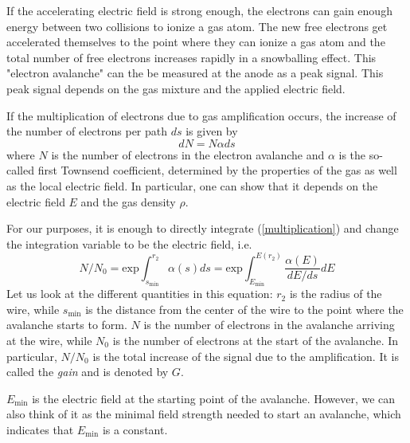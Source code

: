 \documentclass[12pt]{article}
\begin{document}
If the accelerating electric field is strong enough, the electrons can gain enough energy between two collisions to ionize a gas atom. The new free electrons get accelerated themselves to the point where they can ionize a gas atom and the total number of free electrons increases rapidly in a snowballing effect. This "electron avalanche" can the be measured at the anode as a peak signal. This peak signal depends on the gas mixture and the applied electric field.

If the multiplication of electrons due to gas amplification occurs, the increase of the number of electrons per path $ds$ is given by
\begin{equation}
	dN = N\alpha ds
\label{multiplication}
\end{equation}
where $N$ is the number of electrons in the electron avalanche and $\alpha$ is the so-called first Townsend coefficient, determined by the properties of the gas as well as the local electric field. In particular, one can show that it depends on the electric field $E$ and the gas density $\rho$.
	
For our purposes, it is enough to directly integrate (\ref{multiplication}) and change the integration variable to be the electric field, i.e.
\begin{equation}
	N/N_0 = \text{exp} \int^{r_2}_{s_{\min}}\alpha(s)ds = \text{exp} \int^{E(r_2)}_{E_{\min}} \frac{\alpha(E)}{dE/ds}dE
    \label{basic_integral}
\end{equation}
Let us look at the different quantities in this equation: $r_2$ is the radius of the wire, while $s_{\text{min}}$ is the distance from the center of the wire to the point where the avalanche starts to form. $N$ is the number of electrons in the avalanche arriving at the wire, while $N_0$ is the number of electrons at the start of the avalanche. In particular, $N/N_0$ is the total increase of the signal due to the amplification. It is called the \emph{gain} and is denoted by $G$.
	
$E_{\text{min}}$ is the electric field at the starting point of the avalanche. However, we can also think of it as the minimal field strength needed to start an avalanche, which indicates that $E_{\text{min}}$ is a constant.
	
\end{document}
